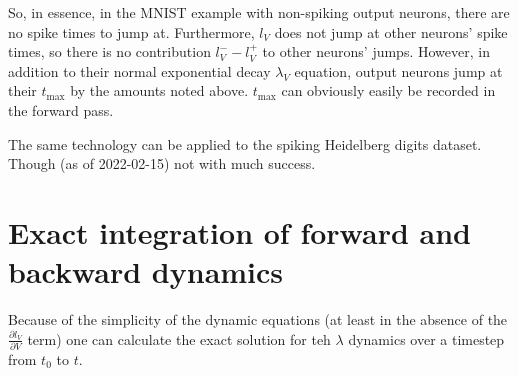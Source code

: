 \documentclass[a4paper]{article}
\begin{document}
So, in essence, in the MNIST example with non-spiking output neurons, there are no spike times to jump at. Furthermore, $l_V$ does not jump at other neurons' spike times, so there is no contribution $l_V^- - l_V^+$ to other neurons' jumps. However, in addition to their normal exponential decay $\lambda_V$ equation, output neurons jump at their $t_{\text{max}}$ by the amounts noted above. $t_{\text{max}}$ can obviously easily be recorded in the forward pass.

The same technology can be applied to the spiking Heidelberg digits dataset. Though (as of 2022-02-15) not with much success.

\section{Exact integration of forward and backward dynamics}
Because of the simplicity of the dynamic equations (at least in the absence of the $\frac{\partial l_V}{\partial V}$ term) one can calculate the exact solution for teh $\lambda$ dynamics over a timestep from $t_0$ to $t$.
\end{document}
